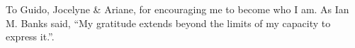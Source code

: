 \begin{dedication}
    To Guido, Jocelyne \& Ariane, for encouraging me to become who I am.
    As Ian M. Banks said, ``My gratitude extends beyond the limits of my capacity to express it.''.
\end{dedication}

